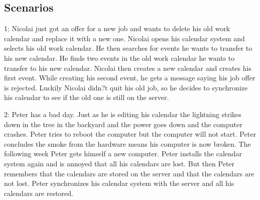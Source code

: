 \subsection{Scenarios}
1: 
Nicolai just got an offer for a new job and wants to delete his old work calendar and replace it with a new one. Nicolai opens his calendar system and selects his old work calendar. He then searches for events he wants to transfer to his new calendar. He finds two events in the old work calendar he wants to transfer to his new calendar. Nicolai then creates a new calendar and creates his first event. While creating his second event, he gets a message saying his job offer is rejected. Luckily Nicolai didn?t quit his old job, so he decides to synchronize his calendar to see if the old one is still on the server.

2:
Peter has a bad day. Just as he is editing his calendar the lightning strikes down in the tree in the backyard and the power goes down and the computer crashes. Peter tries to reboot the computer but the computer will not start. Peter concludes the smoke from the hardware means his computer is now broken. The following week Peter gets himself a new computer. Peter installs the calendar system again and is annoyed that all his calendars are lost. But then Peter remembers that the calendars are stored on the server and that the calendars are not lost.
Peter synchronizes his calendar system with the server and all his calendars are restored.